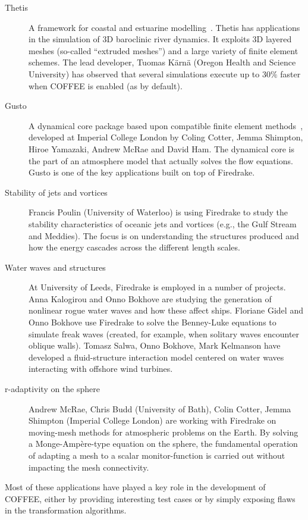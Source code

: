 \begin{description}
\item[Thetis] A framework for coastal and estuarine modelling~\citep{thetis-webpage}. Thetis has applications in the simulation of 3D baroclinic river dynamics. It exploits 3D layered meshes (so-called ``extruded meshes'') and a large variety of finite element schemes. The lead developer, Tuomas K{\"a}rn{\"a} (Oregon Health and Science University) has observed that several simulations execute up to 30$\%$ faster when COFFEE is enabled (as by default).
\item[Gusto] A dynamical core package based upon compatible finite element methods~\citep{gusto-webpage}, developed at Imperial College London by Coling Cotter, Jemma Shimpton, Hiroe Yamazaki, Andrew McRae and David Ham. The dynamical core is the part of an atmosphere model that actually solves the flow equations. Gusto is one of the key applications built on top of Firedrake.
\item[Stability of jets and vortices] Francis Poulin (University of Waterloo) is using Firedrake to study the stability characteristics of oceanic jets and vortices (e.g., the Gulf Stream and Meddies). The focus is on understanding the structures produced and how the energy cascades across the different length scales.
\item[Water waves and structures] At University of Leeds, Firedrake is employed in a number of projects. Anna Kalogirou and Onno Bokhove are studying the generation of nonlinear rogue water waves and how these affect ships. Floriane Gidel and Onno Bokhove use Firedrake to solve the Benney-Luke equations to simulate freak waves (created, for example, when solitary waves encounter oblique walls). Tomasz Salwa, Onno Bokhove, Mark Kelmanson have developed a fluid-structure interaction model centered on water waves interacting with offshore wind turbines.
\item[r-adaptivity on the sphere] Andrew McRae, Chris Budd (University of Bath), Colin Cotter, Jemma Shimpton (Imperial College London) are working with Firedrake on moving-mesh methods for atmospheric problems on the Earth. By solving a Monge-Ampère-type equation on the sphere, the fundamental operation of adapting a mesh to a scalar monitor-function is carried out without impacting the mesh connectivity.
\end{description}

Most of these applications have played a key role in the development of COFFEE, either by providing interesting test cases or by simply exposing flaws in the transformation algorithms.